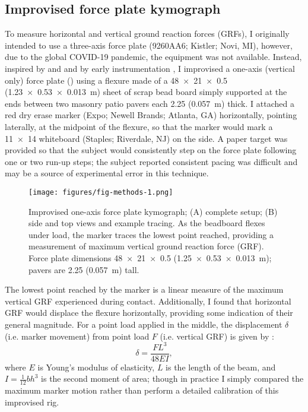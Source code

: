 \subsection{Improvised force plate kymograph}
To measure horizontal and vertical ground reaction forces (GRFs), I originally intended to use a three-axis force plate (9260AA6; Kistler; Novi, MI), however, due to the global COVID-19 pandemic, the equipment was not available. Instead, inspired by \citet{denny1983simple} and \citet{bell1984quantifying} and by early instrumentation \citep{baker2007history, mayer2010physiological, marey1873locomotion, carlet1872essai}, I improvised a one-axis (vertical only) force plate () using a flexure made of a \SI{48 x 21 x 0.5}{\inch} (\SI{1.23 x 0.53 x 0.013}{\meter}) sheet of scrap bead board simply supported at the ends between two masonry patio pavers each \SI{2.25}{\inch} (\SI{0.057}{\meter}) thick. I attached a red dry erase marker (Expo; Newell Brands; Atlanta, GA) horizontally, pointing laterally, at the midpoint of the flexure, so that the marker would mark a \SI{11x14}{\inch} whiteboard (Staples; Riverdale, NJ) on the side. A paper target was provided so that the subject would consistently step on the force plate following one or two run-up steps; the subject reported consistent pacing was difficult and may be a source of experimental error in this technique.
\begin{figure}
\begin{center}
\texttt{[image: figures/fig-methods-1.png]}
\end{center}
\caption{Improvised one-axis force plate kymograph; (A) complete setup; (B) side and top views and example tracing. As the beadboard flexes under load, the marker traces the lowest point reached, providing a measurement of maximum vertical ground reaction force (GRF). Force plate dimensions \SI{48 x 21 x 0.5}{\inch} (\SI{1.25 x 0.53 x0.013}{\meter}); pavers are \SI{2.25}{\inch} (\SI{0.057}{\meter}) tall.}
\label{fig:methods:forceplate}
\end{figure}
The lowest point reached by the marker is a linear measure of the maximum vertical GRF experienced during contact. Additionally, I found that horizontal GRF would displace the flexure horizontally, providing some indication of their general magnitude. For a point load applied in the middle, the displacement $\delta$ (i.e. marker movement) from point load $F$ (i.e. vertical GRF) is given by \cite{craig2011mechanics}: 
\begin{equation}
\delta = \frac{FL^3}{48 EI},
\label{eq:sensor-response}
\end{equation}
where $E$ is Young's modulus of elasticity, $L$ is the length of the beam, and $I=\frac{1}{12}bh^3$ is the second moment of area; though in practice I simply compared the maximum marker motion rather than perform a detailed calibration of this improvised rig. 

